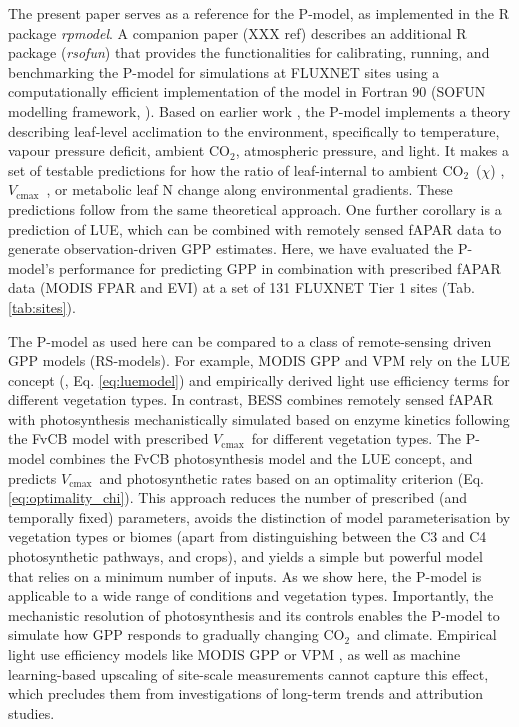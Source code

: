 \documentclass{myreport}
\newcommand{\coo}{CO$_2$}
\newcommand{\vcmax}{$V_{\text{cmax}}$}
\begin{document}
The present paper serves as a reference for the P-model, as implemented in the R package \textit{rpmodel}. A companion paper (XXX ref) describes an additional R package (\textit{rsofun}) that provides the functionalities for calibrating, running, and benchmarking the P-model for simulations at FLUXNET sites using a computationally efficient implementation of the model in Fortran 90 (SOFUN modelling framework, \cite{sofun_v110}). Based on earlier work \citep{wright03, prentice14ecollett, wang17natpl}, the P-model implements a theory describing leaf-level acclimation to the environment, specifically to temperature, vapour pressure deficit, ambient \coo , atmospheric pressure, and light. It makes a set of testable predictions for how the ratio of leaf-internal to ambient \coo\ ($\chi$) \citep{wang17natpl}, \vcmax\ \citep{smith19ecollett}, or metabolic leaf N \citep{dong16bg} change along environmental gradients. These predictions follow from the same theoretical approach. One further corollary is a prediction of LUE, which can be combined with remotely sensed fAPAR data to generate observation-driven GPP estimates. Here, we have evaluated the P-model's performance for predicting GPP in combination with prescribed fAPAR data (MODIS FPAR and EVI) at a set of 131 FLUXNET Tier 1 sites (Tab. \ref{tab:sites}).

The P-model as used here can be compared to a class of remote-sensing driven GPP models (RS-models). For example, MODIS GPP \citep{running04} and VPM \citep{Zhang2017-yr} rely on the LUE concept (\cite{monteith72}, Eq. \ref{eq:luemodel}) and empirically derived light use efficiency terms for different vegetation types. In contrast, BESS \citep{jiang16rse} combines remotely sensed fAPAR with photosynthesis mechanistically simulated based on enzyme kinetics following the FvCB model with prescribed \vcmax\ for different vegetation types. The P-model combines the FvCB photosynthesis model and the LUE concept, and predicts \vcmax\ and photosynthetic rates based on an optimality criterion (Eq. \ref{eq:optimality_chi}). This approach reduces the number of prescribed (and temporally fixed) parameters, avoids the distinction of model parameterisation by vegetation types or biomes (apart from distinguishing between the C3 and C4 photosynthetic pathways, and crops), and yields a simple but powerful model that relies on a minimum number of inputs. As we show here, the P-model is applicable to a wide range of conditions and vegetation types. Importantly, the mechanistic resolution of photosynthesis and its controls enables the P-model to simulate how GPP responds to gradually changing \coo\ and climate. Empirical light use efficiency models like MODIS GPP \citep{running04} or VPM \citep{Zhang2017-yr}, as well as machine learning-based upscaling of site-scale measurements \citep{jung11jgr, tramontana16bg} cannot capture this effect, which precludes them from investigations of long-term trends and attribution studies.
\end{document}
